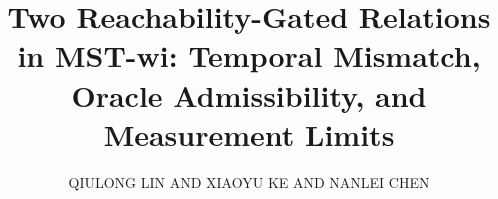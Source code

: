 \documentclass{ieeeaccess}
\newcommand{\orcidicon}[1]{\href{https://orcid.org/#1}{\usebox{\ORCIDlogo}}}
\theoremstyle{definition}
\begin{document}
\history{}
\doi{}

\title{Two Reachability-Gated Relations in MST-wi: Temporal Mismatch, Oracle Admissibility, and Measurement Limits}

\author{\uppercase{Qiulong Lin}\orcidicon{0009-0000-5392-4475}
AND \uppercase{Xiaoyu Ke}
AND \uppercase{Nanlei Chen}}

\address[1]{Yango University, Fuzhou 350015, China (e-mail: ubfbzu3@163.com; 5197211@qq.com)}
\address[2]{Sogang University, Seoul 04107, Republic of Korea}


\end{document}
